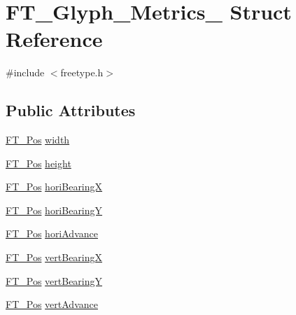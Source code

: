 \hypertarget{struct_f_t___glyph___metrics__}{\section{F\-T\-\_\-\-Glyph\-\_\-\-Metrics\-\_\- Struct Reference}
\label{struct_f_t___glyph___metrics__}
}


{\ttfamily \#include $<$freetype.\-h$>$}

\subsection*{Public Attributes}
\begin{DoxyCompactItemize}
\item 
\hyperlink{ftimage_8h_af5f230f4b253d4c7715fd2e595614c90}{F\-T\-\_\-\-Pos} \hyperlink{struct_f_t___glyph___metrics___a0ff1be869e6a28d1f2990b0e5719dca9}{width}
\item 
\hyperlink{ftimage_8h_af5f230f4b253d4c7715fd2e595614c90}{F\-T\-\_\-\-Pos} \hyperlink{struct_f_t___glyph___metrics___aa2a76ec448ec9d18acf343f01b77cb21}{height}
\item 
\hyperlink{ftimage_8h_af5f230f4b253d4c7715fd2e595614c90}{F\-T\-\_\-\-Pos} \hyperlink{struct_f_t___glyph___metrics___a2afc877f52c8a8910ec144a1948186cc}{hori\-Bearing\-X}
\item 
\hyperlink{ftimage_8h_af5f230f4b253d4c7715fd2e595614c90}{F\-T\-\_\-\-Pos} \hyperlink{struct_f_t___glyph___metrics___afd97c10d43ed1f66598a18884468b536}{hori\-Bearing\-Y}
\item 
\hyperlink{ftimage_8h_af5f230f4b253d4c7715fd2e595614c90}{F\-T\-\_\-\-Pos} \hyperlink{struct_f_t___glyph___metrics___af12db260a90b8a7c938ad48ebf20ccbe}{hori\-Advance}
\item 
\hyperlink{ftimage_8h_af5f230f4b253d4c7715fd2e595614c90}{F\-T\-\_\-\-Pos} \hyperlink{struct_f_t___glyph___metrics___aead5c5637b983b811738bff3bcea8cea}{vert\-Bearing\-X}
\item 
\hyperlink{ftimage_8h_af5f230f4b253d4c7715fd2e595614c90}{F\-T\-\_\-\-Pos} \hyperlink{struct_f_t___glyph___metrics___a7f1aba91b86fddeb11030eab15dcce08}{vert\-Bearing\-Y}
\item 
\hyperlink{ftimage_8h_af5f230f4b253d4c7715fd2e595614c90}{F\-T\-\_\-\-Pos} \hyperlink{struct_f_t___glyph___metrics___a594f43c64fe5c12a399a0f0a47c04990}{vert\-Advance}
\end{DoxyCompactItemize}


